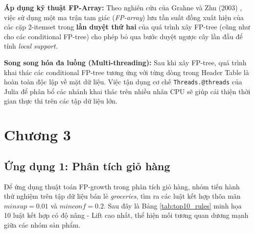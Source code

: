 \documentclass[conference]{IEEEtran}
\begin{document}
\textbf{Áp dụng kỹ thuật FP-Array:} 
Theo nghiên cứu của Grahne và Zhu (2003) \cite{grahne2003efficiently}, việc sử dụng một ma trận tam giác (\textit{FP-array}) lưu tần suất đồng xuất hiện của các cặp 2-itemset trong \textbf{lần duyệt thứ hai} của quá trình xây FP-tree (cũng như cho các conditional FP-tree) cho phép bỏ qua bước duyệt ngược cây lần đầu để tính \textit{local support}.

\textbf{Song song hóa đa luồng (Multi-threading):} 
Sau khi xây FP-tree, quá trình khai thác các conditional FP-tree tương ứng với từng dòng trong Header Table là hoàn toàn độc lập về mặt dữ liệu. Việc tận dụng cơ chế \texttt{Threads.@threads} của Julia để phân bổ các nhánh khai thác trên nhiều nhân CPU sẽ giúp cải thiện thời gian thực thi trên các tập dữ liệu lớn.

\section{Chương 3}

\subsection{Ứng dụng 1: Phân tích giỏ hàng}
Để ứng dụng thuật toán FP-growth trong phân tích giỏ hàng, nhóm tiến hành thử nghiệm trên tập dữ liệu bán lẻ \textit{groceries}, tìm ra các luật kết hợp thõa mãn $minsup = 0.01$ và $minconf = 0.2$. Sau đây là Bảng \ref{tab:top10_rules} minh họa 10 luật kết hợp có độ nâng - Lift cao nhất, thể hiện mối tương quan dương mạnh giữa các nhóm sản phẩm.
\end{document}
